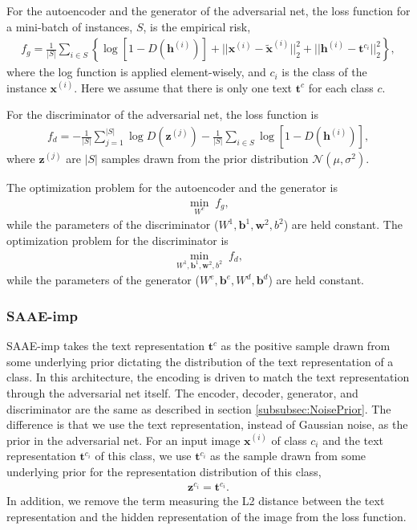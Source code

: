 \documentclass{article}
\newcommand{\bb}[1]{\boldsymbol{#1}}
\begin{document}
	For the autoencoder and the generator of the adversarial net, the loss function for a mini-batch of instances, $S$, is the empirical risk,
	\begin{align}
		f_g = \frac{1}{|S|} \sum_{i \in S} \left\{ \log\left[ 1 - D( \bb{h}^{(i)} ) \right] + || \bb{x}^{(i)} - \tilde{\bb{x}}^{(i)} ||_2^2 + || \bb{h}^{(i)} - \bb{t}^{c_i} ||_2^2 \right\},
	\end{align}
	where the log function is applied element-wisely, and $c_i$ is the class of the instance $\bb{x}^{(i)}$. Here we assume that there is only one text $\bb{t}^c$ for each class $c$.

	For the discriminator of the adversarial net, the loss function is
	\begin{align}
		f_d = -\frac{1}{|S|} \sum_{j = 1}^{|S|} \log D( \bb{z}^{(j)} ) - \frac{1}{|S|} \sum_{i \in S} \log\left[ 1 - D( \bb{h}^{(i)} ) \right],
	\end{align}
	where $\bb{z}^{(j)}$ are $|S|$ samples drawn from the prior distribution $\mathcal{N}(\mu, \sigma^2)$.
	
	The optimization problem for the autoencoder and the generator is
	\begin{align}
		\min_{W^e} \; f_g,
	\end{align}
	while the parameters of the discriminator ($W^1, \bb{b}^1, \bb{w}^2, b^2$) are held constant. The optimization problem for the discriminator is
	\begin{align}
		\min_{W^1, \bb{b}^1, \bb{w}^2, b^2} \; f_d,
	\end{align}
	while the parameters of the generator ($W^e, \bb{b}^e, W^d, \bb{b}^d$) are held constant.



\subsubsection{SAAE-imp}
\label{subsubsec:TextPrior}
	
	SAAE-imp takes the text representation $\bb{t}^c$ as the positive sample drawn from some underlying prior dictating the distribution of the text representation of a class. In this architecture, the encoding is driven to match the text representation through the adversarial net itself. The encoder, decoder, generator, and discriminator are the same as described in section \ref{subsubsec:NoisePrior}. The difference is that we use the text representation, instead of Gaussian noise, as the prior in the adversarial net. For an input image $\bb{x}^{(i)}$ of class $c_i$ and the text representation $\bb{t}^{c_i}$ of this class, we use $\bb{t}^{c_i}$ as the sample drawn from some underlying prior for the representation distribution of this class,
	\begin{align}
		\bb{z}^{c_i} = \bb{t}^{c_i}.
	\end{align}
	In addition, we remove the term measuring the L2 distance between the text representation and the hidden representation of the image from the loss function.
\end{document}
